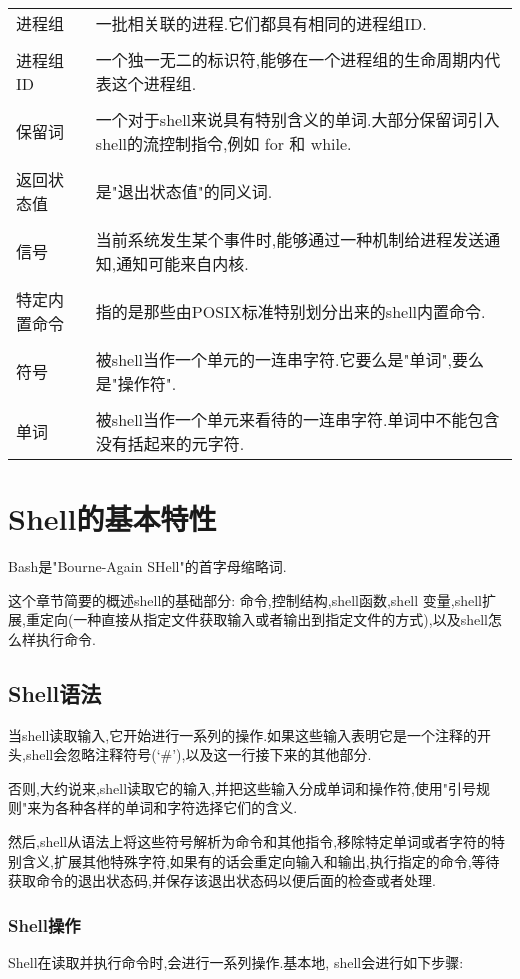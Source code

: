 \documentclass[draft,openany]{book}
\begin{document}
\begin{CJK}{UTF8}{gbsn}
\begin{tabular}{lp{32em}}
        进程组 & 一批相关联的进程.它们都具有相同的进程组ID.\\ \\
        进程组ID & 一个独一无二的标识符,能够在一个进程组的生命周期内代表这个进程组.\\ \\
        保留词 & 一个对于shell来说具有特别含义的单词.大部分保留词引入shell的流控制指令,例如 for 和 while.\\ \\
        返回状态值 & 是"退出状态值"的同义词.\\ \\
        信号 & 当前系统发生某个事件时,能够通过一种机制给进程发送通知,通知可能来自内核.\\ \\
        特定内置命令 & 指的是那些由POSIX标准特别划分出来的shell内置命令.\\ \\
        符号 & 被shell当作一个单元的一连串字符.它要么是"单词",要么是"操作符".\\ \\
        单词 & 被shell当作一个单元来看待的一连串字符.单词中不能包含没有括起来的元字符.
    \end{tabular}

    \chapter{Shell的基本特性}
    Bash是"Bourne-Again SHell"的首字母缩略词.\par
    这个章节简要的概述shell的基础部分: 命令,控制结构,shell函数,shell 变量,shell扩展,重定向(一种直接从指定文件获取输入或者输出到指定文件的方式),以及shell怎么样执行命令.

    \section{Shell语法}
    当shell读取输入,它开始进行一系列的操作.如果这些输入表明它是一个注释的开头,shell会忽略注释符号(`\#'),以及这一行接下来的其他部分.\par
    否则,大约说来,shell读取它的输入,并把这些输入分成单词和操作符,使用"引号规则"来为各种各样的单词和字符选择它们的含义.\par
    然后,shell从语法上将这些符号解析为命令和其他指令,移除特定单词或者字符的特别含义,扩展其他特殊字符,如果有的话会重定向输入和输出,执行指定的命令,等待获取命令的退出状态码,并保存该退出状态码以便后面的检查或者处理.

    \subsection{Shell操作}
    Shell在读取并执行命令时,会进行一系列操作.基本地, shell会进行如下步骤:\par


\end{CJK}
\end{document}

